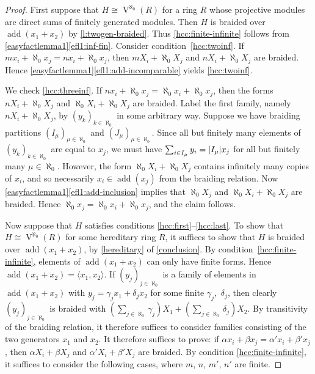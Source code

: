 \documentclass[a4paper,11pt,oneside]{amsart}
\theoremstyle{remark}
\DeclareMathOperator{\add}{add}
\DeclarePairedDelimiter{\card}{\lvert}{\rvert}
\DeclareMathOperator{\Vmon}{V}
\begin{document}
\begin{proof}
  First suppose that $H \cong \Vmon^{\aleph_0}(R)$ for a ring $R$ whose projective modules are direct sums of finitely generated modules.
  Then $H$ is braided over $\add(x_1+x_2)$ by \cref{l:twogen-braided}.
  Thus \ref{hcc:finite-infinite} follows from \cref{easyfactlemma1}\ref{efl1:inf-fin}.
  Consider condition~\ref{hcc:twoinf}.
  If $m x_i + \aleph_0 x_j=n x_i + \aleph_0 x_j$, then $m X_i + \aleph_0 X_j$ and $n X_i + \aleph_0 X_j$ are braided.
  Hence \cref{easyfactlemma1}\ref{efl1:add-incomparable} yields \ref{hcc:twoinf}.

  We check \ref{hcc:threeinf}.
  If $n x_i + \aleph_0 x_j = \aleph_0 x_i + \aleph_0 x_j$, then the forms $n X_i + \aleph_0 X_j$ and $\aleph_0 X_i + \aleph_0 X_j$ are braided.
  Label the first family, namely $n X_i + \aleph_0 X_j$, by $(y_k)_{k \in \aleph_0}$ in some arbitrary way.
  Suppose we have braiding partitions $(I_\mu)_{\mu \in \aleph_0}$ and $(J_\mu)_{\mu \in \aleph_0}$.
  Since all but finitely many elements of $(y_k)_{k \in \aleph_0}$ are equal to $x_j$, we must have $\sum_{i \in I_\mu} y_i = \card{I_\mu} x_j$ for all but finitely many $\mu \in \aleph_0$.
  However, the form $\aleph_0 X_i + \aleph_0 X_j$ contains infinitely many copies of $x_i$, and so necessarily $x_i \in \add(x_j)$ from the braiding relation.
  Now \cref{easyfactlemma1}\ref{efl1:add-inclusion} implies that $\aleph_0 X_j$ and $\aleph_0 X_i + \aleph_0 X_j$ are braided.
  Hence $\aleph_0 x_j = \aleph_0 x_i + \aleph_0 x_j$, and the claim follows.
  
  Now suppose that $H$ satisfies conditions \ref{hcc:first}--\ref{hcc:last}.
  To show that $H \cong \Vmon^{\aleph_0}(R)$ for some hereditary ring $R$, it suffices to show that $H$ is braided over $\add(x_1+x_2)$, by \ref{hereditary} of \cref{conclusion}.
  By condition~\ref{hcc:finite-infinite}, elements of $\add(x_1+x_2)$ can only have finite forms.
  Hence $\add(x_1+x_2) = \langle x_1, x_2 \rangle$.
  If $(y_j)_{j \in \aleph_0}$ is a family of elements in $\add(x_1+x_2)$ with $y_j = \gamma_j x_1 + \delta_j x_2$ for some finite $\gamma_j$,~$\delta_j$, then clearly $(y_j)_{j \in \aleph_0}$ is braided with $(\sum_{j \in \aleph_0} \gamma_j) X_1 + (\sum_{j \in \aleph_0} \delta_j) X_2$.
  By transitivity of the braiding relation, it therefore suffices to consider families consisting of the two generators $x_1$ and $x_2$.
  It therefore suffices to prove: if $\alpha x_i + \beta x_j =  \alpha' x_i + \beta' x_j$, then $\alpha X_i + \beta X_j$ and $\alpha' X_i + \beta' X_j$ are braided.
  By condition \ref{hcc:finite-infinite}, it suffices to consider the following cases, where $m$, $n$, $m'$, $n'$ are finite.


\end{proof}
\end{document}
